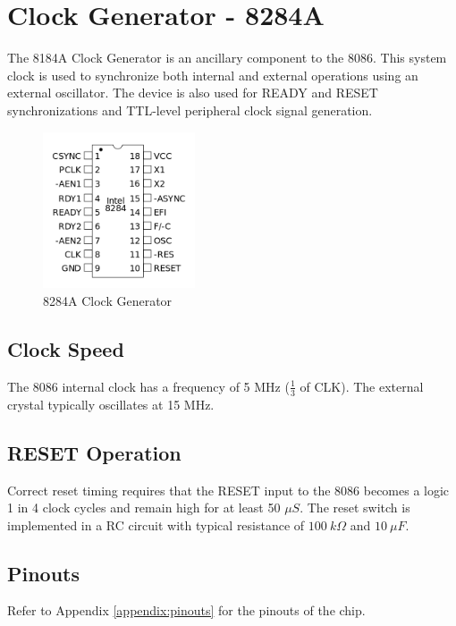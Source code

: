\newpage
\section{Clock Generator - 8284A}
The 8184A Clock Generator is an ancillary component to the 8086. This system clock is used to synchronize both internal and external operations using an external oscillator. The device is also used for READY and RESET synchronizations and TTL-level peripheral clock signal generation.

        \begin{figure}[h]
            \begin{center}
                \includegraphics[width=0.4\textwidth]{figures/8284a.png}
                \caption{8284A Clock Generator} \label{fig:8284a}
            \end{center}
        \end{figure}

    \subsection{Clock Speed}
    The 8086 internal clock has a frequency of 5 MHz ($\frac{1}{3}$ of CLK). The external crystal typically oscillates at 15 MHz.

    \subsection{RESET Operation}
    Correct reset timing requires that the RESET input to the 8086 becomes a logic 1 in 4 clock cycles and remain high for at least 50 $\mu S$. The reset switch is implemented in a RC circuit with typical resistance of $100 \ k\Omega$ and $10 \ \mu F$.

    \subsection{Pinouts}
    Refer to Appendix \ref{appendix:pinouts} for the pinouts of the chip.
